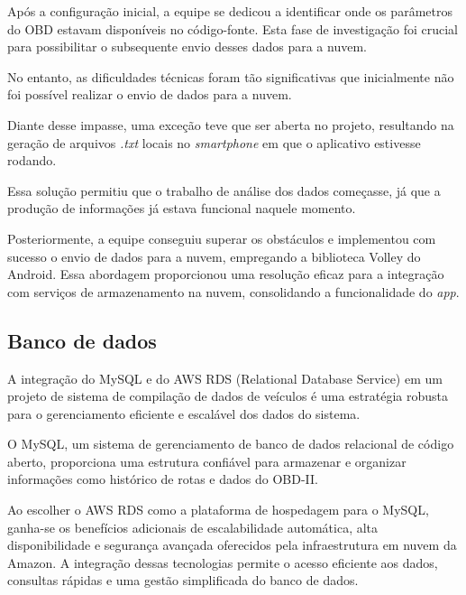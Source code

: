     Após a configuração inicial, a equipe se dedicou a identificar onde os parâmetros do OBD estavam disponíveis no código-fonte. Esta fase de investigação foi crucial para possibilitar o subsequente envio desses dados para a nuvem.

    No entanto, as dificuldades técnicas foram tão significativas que inicialmente não foi possível realizar o envio de dados para a nuvem. 
    
    Diante desse impasse, uma exceção teve que ser aberta no projeto, resultando na geração de arquivos \textit{.txt} locais no \textit{smartphone} em que o aplicativo estivesse rodando. 
    
    Essa solução permitiu que o trabalho de análise dos dados começasse, já que a produção de informações já estava funcional naquele momento.
    
    Posteriormente, a equipe conseguiu superar os obstáculos e implementou com sucesso o envio de dados para a nuvem, empregando a biblioteca Volley do Android. Essa abordagem proporcionou uma resolução eficaz para a integração com serviços de armazenamento na nuvem, consolidando a funcionalidade do \textit{app}. 

    
    
    
    
    \subsection{Banco de dados} 
    A integração do MySQL e do AWS RDS (Relational Database Service) em um projeto de sistema de compilação de dados de veículos é uma estratégia robusta para o gerenciamento eficiente e escalável dos dados do sistema. 
    
    O MySQL, um sistema de gerenciamento de banco de dados relacional de código aberto, proporciona uma estrutura confiável para armazenar e organizar informações como histórico de rotas e dados do OBD-II. 
     
     Ao escolher o AWS RDS como a plataforma de hospedagem para o MySQL, ganha-se os benefícios adicionais de escalabilidade automática, alta disponibilidade e segurança avançada oferecidos pela infraestrutura em nuvem da Amazon. A integração dessas tecnologias permite o acesso eficiente aos dados, consultas rápidas e uma gestão simplificada do banco de dados. 
     
